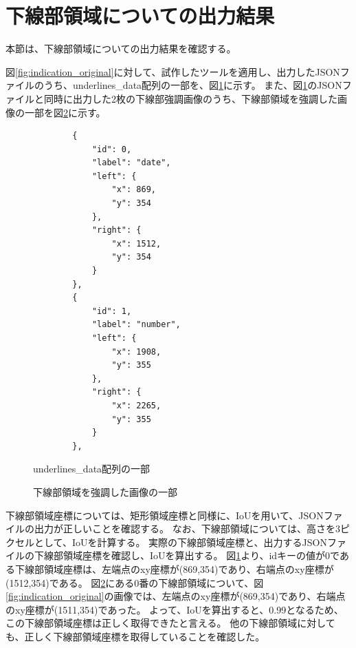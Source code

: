 \section{下線部領域についての出力結果}\label{sec:result_underline}
本節は、下線部領域についての出力結果を確認する。

図\ref{fig:indication_original}に対して、試作したツールを適用し、出力したJSONファイルのうち、underlines\_data配列の一部を、図\ref{fig:underlines_data_json}に示す。
また、図\ref{fig:underlines_data_json}のJSONファイルと同時に出力した2枚の下線部強調画像のうち、下線部領域を強調した画像の一部を図\ref{fig:highlighted_underlines_part}に示す。

\lstset{language=}
\begin{figure}[t]
    \begin{lstlisting}
        {
            "id": 0,
            "label": "date",
            "left": {
                "x": 869,
                "y": 354
            },
            "right": {
                "x": 1512,
                "y": 354
            }
        },
        {
            "id": 1,
            "label": "number",
            "left": {
                "x": 1908,
                "y": 355
            },
            "right": {
                "x": 2265,
                "y": 355
            }
        },
    \end{lstlisting}
    \caption{underlines\_data配列の一部}\label{fig:underlines_data_json}
\end{figure}

\begin{figure}[tp]
    \begin{center}
        \caption{下線部領域を強調した画像の一部}
        \label{fig:highlighted_underlines_part}
    \end{center}
\end{figure}

下線部領域座標については、矩形領域座標と同様に、IoUを用いて、JSONファイルの出力が正しいことを確認する。
なお、下線部領域については、高さを3ピクセルとして、IoUを計算する。
実際の下線部領域座標と、出力するJSONファイルの下線部領域座標を確認し、IoUを算出する。
図\ref{fig:underlines_data_json}より、idキーの値が0である下線部領域座標は、左端点のxy座標が(869,354)であり、右端点のxy座標が(1512,354)である。
図\ref{fig:highlighted_underlines_part}にある0番の下線部領域について、図\ref{fig:indication_original}の画像では、左端点のxy座標が(869,354)であり、右端点のxy座標が(1511,354)であった。
よって、IoUを算出すると、0.99となるため、この下線部領域座標は正しく取得できたと言える。
他の下線部領域に対しても、正しく下線部領域座標を取得していることを確認した。


